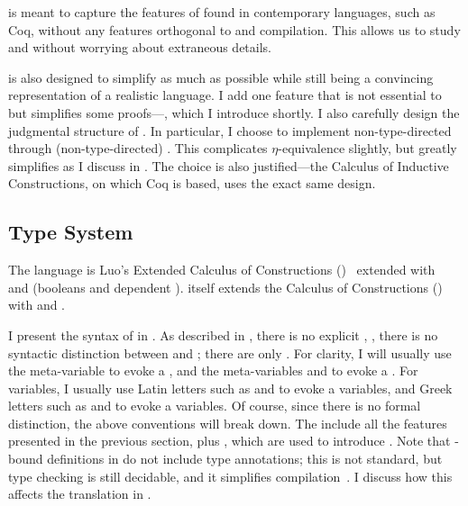 \slang is meant to capture the features of  found in
contemporary  languages, such as Coq, without any
features orthogonal to  and  compilation.
This allows us to study  and  without
worrying about extraneous details.

\slang is also designed to simplify  as much as possible
while still being a convincing representation of a realistic  language.
I add one feature that is not essential to  but simplifies some
proofs---, which I introduce shortly.
I also carefully design the judgmental structure of \slang.
In particular, I choose to implement non-type-directed 
through (non-type-directed) .
This complicates \(\eta\)-equivalence slightly, but greatly simplifies
 as I discuss in .
The choice is also justified---the Calculus of Inductive Constructions, on which
Coq is based, uses the exact same design.

\subsection{Type System}
The language \slang is Luo's Extended Calculus of Constructions
()~\cite{luo1989} extended with ~\cite{severi1994:dpts} and
 (booleans and dependent ).
 itself extends the Calculus of Constructions
()~\cite{coquand1988} with  and .

I present the syntax of \slang in .
As described in , there is no explicit , \ie, there is no syntactic distinction between  and
; there are only .
For clarity, I will usually use the meta-variable \im{\se} to evoke a
, and the meta-variables \im{\sA} and \im{\sB} to evoke a
.
For variables, I usually use Latin letters such as \im{\sx} and \im{\sy} to
evoke a  variables, and Greek letters such as \im{\salpha} and
\im{\sbeta} to evoke a  variables.
Of course, since there is no formal distinction, the above conventions will
break down.
The  include all the features presented in the previous
section, plus   \im{\slete{\sx}{\se}{\sepr}},
which are used to introduce .
Note that -bound definitions in \slang do not include type
annotations; this is not standard, but type checking is still decidable, and it
simplifies compilation~\cite{severi1994:dpts}.
I discuss how this affects the translation in .

